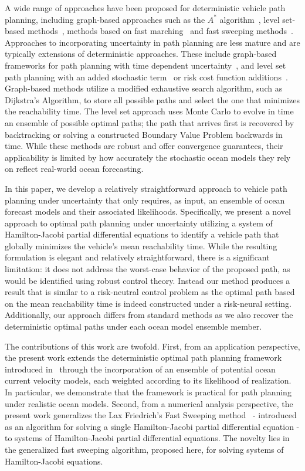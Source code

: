 \documentclass[pdflatex,sn-mathphys-num]{sn-jnl}%
\theoremstyle{thmstyleone}%
\theoremstyle{thmstyletwo}%
\theoremstyle{thmstylethree}%
\begin{document}
A wide range of approaches have been proposed for deterministic vehicle path planning, including graph-based approaches such as the $A^*$ algorithm~\cite{Garau2005}, level set-based methods~\cite{Lolla2014}, methods based on fast marching~\cite{Petres2007} and fast sweeping methods~\cite{Brandman2023, Parkinson2020}.  Approaches to incorporating uncertainty in path planning are less mature and are typically extensions of deterministic approaches.  These include graph-based frameworks for path planning with time dependent uncertainty~\cite{Wellman2013, Rathbun2002}, and level set path planning with an added stochastic term~\cite{Mitchell2005, Subramani2018} or risk cost function additions~\cite{Subramani2019}.  Graph-based methods utilize a modified exhaustive search algorithm, such as Dijkstra's Algorithm, to store all possible paths and select the one that minimizes the reachability time. The level set approach uses Monte Carlo to evolve in time an ensemble of possible optimal paths; the path that arrives first is recovered by backtracking or solving a constructed Boundary Value Problem backwards in time.  While these methods are robust and offer convergence guarantees, their applicability is limited by how accurately the stochastic ocean models they rely on reflect real-world ocean forecasting.


 In this paper, we develop a relatively straightforward approach to vehicle path planning under uncertainty that only requires, as input, an ensemble of ocean forecast models and their associated likelihoods.  Specifically, we present a novel approach to optimal path planning under uncertainty utilizing a system of Hamilton-Jacobi partial differential equations to identify a vehicle path that globally minimizes the vehicle's mean reachability time.  While the resulting formulation is elegant and relatively straightforward, there is a significant limitation: it does not address the worst-case behavior of the proposed path, as would be identified using robust control theory.  Instead our method produces a result that is similar to a risk-neutral control problem as the optimal path based on the mean reachability time is indeed constructed under a risk-neural setting.  Additionally, our approach differs from standard methods as we also recover the deterministic optimal paths under each ocean model ensemble member. 


The contributions of this work are twofold.  First, from an application perspective, the present work extends the deterministic optimal path planning framework introduced in~\cite{Brandman2023} through the incorporation of an ensemble of potential ocean current velocity models, each weighted according to its likelihood of realization. In particular, we demonstrate that the framework is practical for path planning under realistic ocean models.  Second, from a numerical analysis perspective, the present work generalizes the Lax Friedrich's Fast Sweeping method~\cite{Kao2004} - introduced as an algorithm for solving a single Hamilton-Jacobi partial differential equation - to systems of Hamilton-Jacobi partial differential equations.  The novelty lies in the generalized fast sweeping algorithm, proposed here, for solving systems of Hamilton-Jacobi equations.
\end{document}
